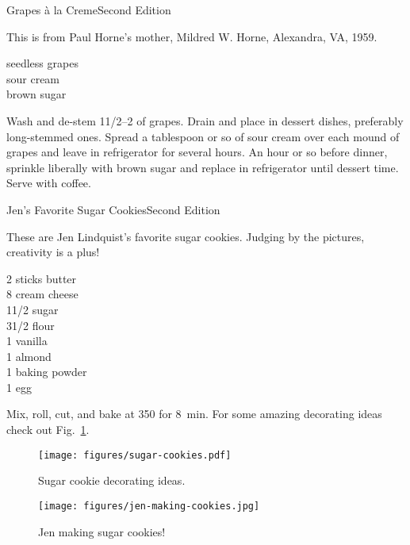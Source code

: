 \begin{entry}{Grapes \`{a} la Creme}{Second Edition}

\begin{open}
    This is from Paul Horne's mother, Mildred W. Horne, Alexandra, VA, 1959.
\end{open}
\begin{ingredients}
    seedless grapes\\
    sour cream\\
    brown sugar
\end{ingredients}
Wash and de-stem 1\SIrange{1/2}{2}{\pound} of grapes. Drain and place in dessert
dishes, preferably long-stemmed ones.  Spread a tablespoon or so of sour cream
over each mound of grapes and leave in refrigerator for several hours.  An hour
or so before dinner, sprinkle liberally with brown sugar and replace in
refrigerator until dessert time.  Serve with coffee.
\end{entry}

\begin{entry}{Jen's Favorite Sugar Cookies}{Second Edition}

\begin{open}
  These are Jen Lindquist's favorite sugar cookies.  Judging by the pictures,
  creativity is a plus!
\end{open}
\begin{ingredients}
    2 sticks butter\\
    \SI{8}{\ounce} cream cheese\\
    1\SI{1/2}{\cup} sugar\\
    3\SI{1/2}{\cup} flour\\
    \SI{1}{\teaspoon} vanilla\\
    \SI{1}{\teaspoon} almond\\
    \SI{1}{\teaspoon} baking powder\\
    1 egg
\end{ingredients}
Mix, roll, cut, and bake at \SI{350}{\degreeF} for \SI{8}{\minute}.  For some
amazing decorating ideas check out Fig.~\ref{fig:sugar-cookie-decorating}.
\begin{figure}
    \centering
    \texttt{[image: figures/sugar-cookies.pdf]}
    \caption{Sugar cookie decorating ideas.}
    \label{fig:sugar-cookie-decorating}
\end{figure}
\begin{figure}[b]
    \centering
    \texttt{[image: figures/jen-making-cookies.jpg]}
    \caption{Jen making sugar cookies!}
\end{figure}
\end{entry}

